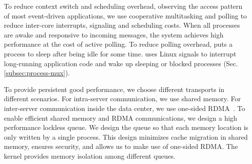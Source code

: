 To reduce context switch and scheduling overhead, observing the access pattern of most event-driven applications, we use cooperative multitasking and polling to reduce inter-core interrupts, signaling and scheduling costs. When all processes are awake and responsive to incoming messages, the system achieves high performance at the cost of active polling. To reduce polling overhead, \sys puts a process to sleep after being idle for some time. \sys uses Linux signals to interrupt long-running application code and wake up sleeping or blocked processes (Sec.\ref{subsec:process-mux}). 




 To provide persistent good performance, we choose different transports in different scenarios. For intra-server communication, we use shared memory. For inter-server communication inside the data center, we use one-sided RDMA~\cite{mitchell2013using,kaminsky2016design}. To enable efficient shared memory and RDMA communications, we design a high performance lockless queue. We design the queue so that each memory location is only written by a single process. This design minimizes cache migration in shared memory, ensures security, and allows us to make use of one-sided RDMA. The kernel provides memory isolation among different queues.

